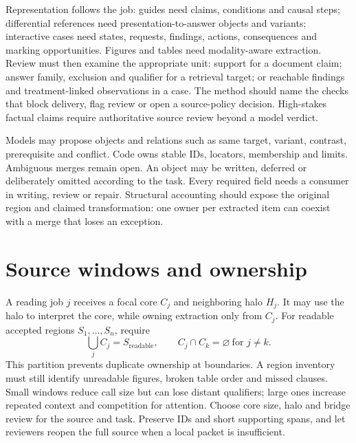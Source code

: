 \documentclass[11pt,letterpaper]{article}
\begin{document}
Representation follows the job: guides need claims, conditions and causal steps; differential references need presentation-to-answer objects and variants; interactive cases need states, requests, findings, actions, consequences and marking opportunities. Figures and tables need modality-aware extraction. Review must then examine the appropriate unit: support for a document claim; answer family, exclusion and qualifier for a retrieval target; or reachable findings and treatment-linked observations in a case. The method should name the checks that block delivery, flag review or open a source-policy decision. High-stakes factual claims require authoritative source review beyond a model verdict.

Models may propose objects and relations such as same target, variant, contrast, prerequisite and conflict. Code owns stable IDs, locators, membership and limits. Ambiguous merges remain open. An object may be written, deferred or deliberately omitted according to the task. Every required field needs a consumer in writing, review or repair. Structural accounting should expose the original region and claimed transformation: one owner per extracted item can coexist with a merge that loses an exception.

\section{Source windows and ownership}
A reading job $j$ receives a focal core $C_j$ and neighboring halo $H_j$. It may use the halo to interpret the core, while owning extraction only from $C_j$. For readable accepted regions $S_1,\ldots,S_n$, require
\begin{equation}
\bigcup_j C_j=S_{\mathrm{readable}},\qquad C_j\cap C_k=\varnothing\ \text{for }j\neq k.
\label{eq:core}
\end{equation}
This partition prevents duplicate ownership at boundaries. A region inventory must still identify unreadable figures, broken table order and missed clauses. Small windows reduce call size but can lose distant qualifiers; large ones increase repeated context and competition for attention. Choose core size, halo and bridge review for the source and task. Preserve IDs and short supporting spans, and let reviewers reopen the full source when a local packet is insufficient.
\end{document}
